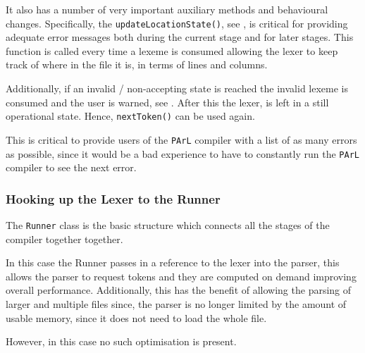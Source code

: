 It also has a number of very important auxiliary
methods and behavioural changes. Specifically, the
\texttt{updateLocationState()}, see
, is critical for providing
adequate error messages both during the current
stage and for later stages. This function is
called every time a lexeme is consumed allowing
the lexer to keep track of where in the file it
is, in terms of lines and columns.



Additionally, if an invalid / non-accepting state
is reached the invalid lexeme is consumed and the
user is warned, see . After
this the lexer, is left in a still operational state.
Hence, \texttt{nextToken()} can be used again.

 This is critical to provide users of the
 \texttt{PArL} compiler with a list of as many
 errors as possible, since it would be a bad
 experience to have to constantly run the
 \texttt{PArL} compiler to see the next error.



\subsubsection{Hooking up the Lexer to the Runner}

The \texttt{Runner} class is the basic structure
which connects all the stages of the
compiler together together.

In this case the Runner passes in a reference to
the lexer into the parser, this allows the parser
to request tokens and they are computed on demand
improving overall performance. Additionally, this
has the benefit of allowing the parsing of larger
and multiple files since, the parser is no longer
limited by the amount of usable memory, since it
does not need to load the whole file.

However, in this case no such optimisation is
present.


